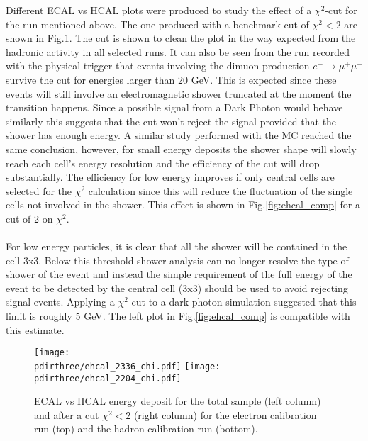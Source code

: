 Different ECAL vs HCAL plots were produced to study the effect of a
$\chi^2$-cut for the run mentioned above. The one produced with
a benchmark cut of $\chi^2 < 2$ are shown in
Fig.\ref{fig:ehcal_test}. The cut is shown to clean the plot in the
way expected from the hadronic activity in all selected runs. It can also be seen from the run recorded with the physical trigger that events involving the dimuon
production $e^- \to \mu^+\mu^-$ survive the cut for energies larger
than 20 GeV.  This is expected since these events will still involve
an electromagnetic shower truncated at the moment the transition
happens. Since a possible signal from a Dark Photon would behave
similarly this suggests that the cut won't reject the signal provided
that the shower has enough energy. A similar study performed with the
MC reached the same conclusion, however, for small energy deposits the shower shape will slowly reach each cell's energy resolution and the efficiency of the cut will drop
substantially. The efficiency for low energy improves if only central
cells are selected for the $\chi^2$ calculation since this will reduce
the fluctuation of the single cells not involved in the shower. This
effect is shown in Fig.\ref{fig:ehcal_comp} for a cut of 2 on $\chi^2$.
\\
\\
For low energy particles, it is clear that all the shower will be
contained in the cell 3x3. Below this threshold shower analysis can no
longer resolve the type of shower of the event and instead the simple
requirement of the full energy of the event to be detected by the
central cell (3x3) should be used to avoid rejecting signal events. Applying a $\chi^2$-cut to a dark photon simulation suggested that this limit is roughly 5 GeV.  The left plot in Fig.\ref{fig:ehcal_comp} is compatible with this estimate.

\begin{figure}[h!]
  \begin{center}
    \texttt{[image: \\pdirthree/ehcal\_2336\_chi.pdf]}
    \texttt{[image: \\pdirthree/ehcal\_2204\_chi.pdf]}
  \end{center}
  \caption[ECAL vs HCAL energy deposit after a cut $\chi^2$]{ECAL vs HCAL energy deposit for the total sample (left
    column) and after a cut $\chi^2<2$ (right column) for the
    electron calibration run (top) and the hadron calibration run (bottom).}
  \label{fig:ehcal_test}
\end{figure}
\clearpage

